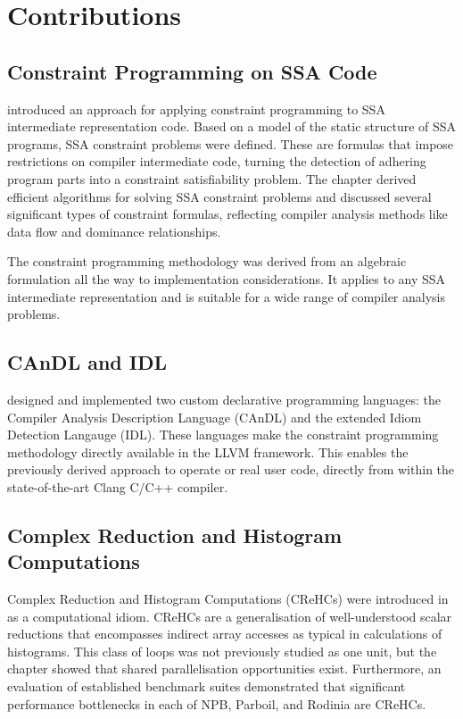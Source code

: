 \section{Contributions}

\subsection*{Constraint Programming on SSA Code}

     introduced an approach for applying constraint
    programming to SSA intermediate representation code.
    Based on a model of the static structure of SSA programs, SSA constraint
    problems were defined.
    These are formulas that impose restrictions on compiler intermediate code,
    turning the detection of adhering program parts into a constraint
    satisfiability problem.
    The chapter derived efficient algorithms for solving SSA constraint problems
    and discussed several significant types of constraint formulas, reflecting
    compiler analysis methods like data flow and dominance relationships.

    The constraint programming methodology was derived from an algebraic
    formulation all the way to implementation considerations.
    It applies to any SSA intermediate representation and is suitable for a
    wide range of compiler analysis problems.

\subsection*{CAnDL and IDL}

     designed and implemented two
    custom declarative programming languages: the Compiler Analysis
    Description Language (CAnDL) and the extended Idiom Detection Langauge
    (IDL).
    These languages make the constraint programming methodology directly
    available in the LLVM framework.
    This enables the previously derived approach to operate or real user code,
    directly from within the state-of-the-art Clang C/C++ compiler.

\subsection*{Complex Reduction and Histogram Computations}

    Complex Reduction and Histogram Computations (CReHCs) were introduced in
     as a computational idiom.
    CReHCs are a generalisation of well-understood scalar reductions that
    encompasses indirect array accesses as typical in calculations of
    histograms.
    This class of loops was not previously studied as one unit, but the
    chapter showed that shared parallelisation opportunities exist.
    Furthermore, an evaluation of established benchmark suites demonstrated
    that significant performance bottlenecks in each of NPB, Parboil, and
    Rodinia are CReHCs.

